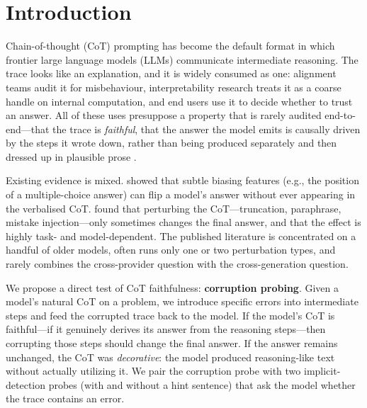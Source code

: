 \documentclass{article}
\begin{document}
\section{Introduction}
\label{sec:intro}

Chain-of-thought (CoT) prompting \citep{wei2022chain} has become the default format in which frontier large language models (LLMs) communicate intermediate reasoning. The trace looks like an explanation, and it is widely consumed as one: alignment teams audit it for misbehaviour, interpretability research treats it as a coarse handle on internal computation, and end users use it to decide whether to trust an answer. All of these uses presuppose a property that is rarely audited end-to-end---that the trace is \emph{faithful}, that the answer the model emits is causally driven by the steps it wrote down, rather than being produced separately and then dressed up in plausible prose \citep{lanham2023measuring,turpin2023language}.

Existing evidence is mixed. \citet{turpin2023language} showed that subtle biasing features (e.g., the position of a multiple-choice answer) can flip a model's answer without ever appearing in the verbalised CoT. \citet{lanham2023measuring} found that perturbing the CoT---truncation, paraphrase, mistake injection---only sometimes changes the final answer, and that the effect is highly task- and model-dependent. The published literature is concentrated on a handful of older models, often runs only one or two perturbation types, and rarely combines the cross-provider question with the cross-generation question.

We propose a direct test of CoT faithfulness: \textbf{corruption probing}. Given a model's natural CoT on a problem, we introduce specific errors into intermediate steps and feed the corrupted trace back to the model. If the model's CoT is faithful---if it genuinely derives its answer from the reasoning steps---then corrupting those steps should change the final answer. If the answer remains unchanged, the CoT was \emph{decorative}: the model produced reasoning-like text without actually utilizing it. We pair the corruption probe with two implicit-detection probes (with and without a hint sentence) that ask the model whether the trace contains an error.
\end{document}
